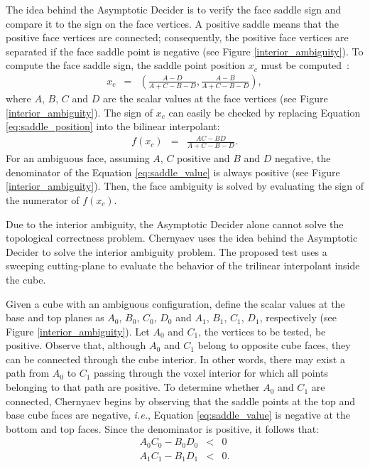 The idea behind the Asymptotic Decider is to verify the face saddle sign and compare it to the sign on the face vertices. A positive saddle means that the positive face vertices are connected; consequently, the positive face vertices are separated if the face saddle point is negative (see Figure \ref{interior_ambiguity}). To compute the face saddle sign, the saddle point position $x_c$ must be computed~\cite{Chernyaev95marchingcubes}:
\begin{eqnarray}
x_c & = & \left( \frac{A - D}{A+C-B-D}, \frac{A - B}{A+C-B-D} \right), \label{eq:saddle_position}
\end{eqnarray}
where $A$, $B$, $C$ and $D$ are the scalar values at the face vertices (see Figure \ref{interior_ambiguity}).
%
The sign of $x_c$ can easily be checked by replacing Equation \eqref{eq:saddle_position} into the bilinear interpolant:
\begin{eqnarray}
f(x_c) & = & \frac{AC - BD}{A+C-B-D}.\label{eq:saddle_value}
\end{eqnarray}
For an ambiguous face, assuming $A$, $C$ positive and $B$ and $D$ negative, the denominator of the Equation \eqref{eq:saddle_value} is always positive (see Figure \ref{interior_ambiguity}). Then, the face ambiguity is solved by evaluating the sign of the numerator of $f(x_c)$.

Due to the interior ambiguity, the Asymptotic Decider alone cannot solve the topological correctness problem. Chernyaev uses the idea behind the Asymptotic Decider to solve the interior ambiguity problem. The proposed test uses a  sweeping cutting-plane to evaluate the behavior of the trilinear interpolant inside the cube.

Given a cube with an ambiguous configuration, define the scalar values at the base and top planes as $A _{0}$, $B_{0}$, $C_{0}$, $D_{0}$ and $A _{1}$, $B_{1}$, $C_{1}$, $D_{1}$, respectively (see Figure \ref{interior_ambiguity}).  Let $A_{0}$ and $C_{1}$, the vertices to be tested, be positive. Observe that, although $A_{0}$ and $C_{1}$ belong to opposite cube faces, they can be connected through the cube interior. In other words, there may exist a path from $A_0$ to $C_1$ passing through the voxel interior for which all points belonging to that path are positive. To determine whether $A_0$ and $C_1$ are connected, Chernyaev begins by observing that the saddle points at the top and base cube faces are negative, \emph{i.e.}, Equation \eqref{eq:saddle_value} is negative at the bottom and top faces. Since the denominator is positive, it follows that:
\begin{eqnarray}
A_0C_0 - B_0D_0 &<& 0 \label{eq:condition1}\\
A_1C_1 - B_1D_1 &<& 0 \label{eq:condition2}.
\end{eqnarray}

